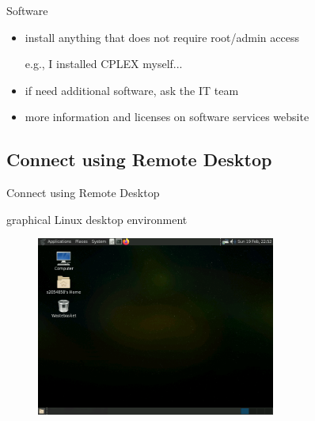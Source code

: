 \documentclass[10pt]{beamer}
\begin{document}
\begin{frame}[fragile]{Software}

\begin{itemize}
    \item {install anything that does not require root/admin access
    
    e.g., I installed CPLEX myself... }
    \item if need additional software, ask the IT team
    \item more information and licenses on software services website\footnotemark
\end{itemize}


\end{frame}

\subsection{Connect using Remote Desktop}

\begin{frame}[fragile]{Connect using Remote Desktop\footnotemark}

graphical Linux desktop environment

\begin{figure}[!ht]
\centering
\includegraphics[width = 0.7\textwidth]{images/Remote_Desktop.png}
\end{figure}


\end{frame}
\end{document}
